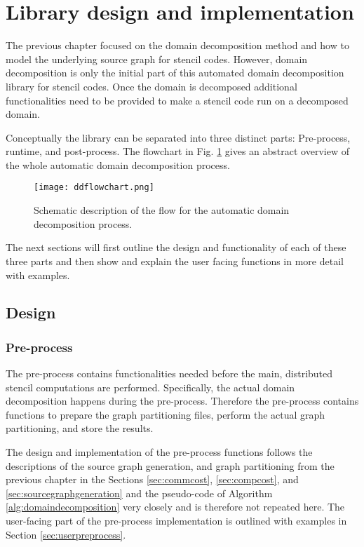 \section{Library design and implementation}
The previous chapter focused on the domain decomposition method and how to model the underlying source graph for stencil codes.
However, domain decomposition is only the initial part of this automated domain decomposition library for stencil codes.
Once the domain is decomposed additional functionalities need to be provided to make a stencil code run on a decomposed domain.

Conceptually the library can be separated into three distinct parts:
Pre-process, runtime, and post-process.
The flowchart in Fig. \ref{fig:library_flowchart} gives an abstract overview of the whole automatic domain decomposition process.

\begin{figure}
\centering
\texttt{[image: ddflowchart.png]}
\caption{Schematic description of the flow for the automatic domain decomposition process.}
\label{fig:library_flowchart}
\end{figure}

The next sections will first outline the design and functionality of each of these three parts and then show and explain the user facing functions in more detail with examples.

\subsection{Design}


\subsubsection{Pre-process}
The pre-process contains functionalities needed before the main, distributed stencil computations are performed.
Specifically, the actual domain decomposition happens during the pre-process.
Therefore the pre-process contains functions to prepare the graph partitioning files, perform the actual graph partitioning, and store the results.

The design and implementation of the pre-process functions follows the descriptions of the source graph generation, and graph partitioning from the previous chapter in the Sections \ref{sec:commcost}, \ref{sec:compcost}, and \ref{sec:sourcegraphgeneration} and the pseudo-code of Algorithm \ref{alg:domaindecomposition} very closely and is therefore not repeated here.
The user-facing part of the pre-process implementation is outlined with examples in Section \ref{sec:userpreprocess}.

